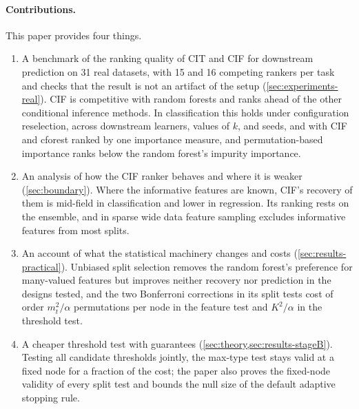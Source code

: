 \paragraph{Contributions.}
This paper provides four things.
\begin{enumerate}[label=(\arabic*),leftmargin=*]
  \item A benchmark of the ranking quality of CIT and CIF for downstream
  prediction on 31 real datasets, with 15 and 16 competing rankers per task and
  checks that the result is not an artifact of the setup
  (\cref{sec:experiments-real}). CIF is competitive with random forests and ranks
  ahead of the other conditional inference methods. In classification this holds under
  configuration reselection, across downstream learners, values of $k$, and
  seeds, and with CIF and cforest ranked by one importance measure, and
  permutation-based importance ranks below the random forest's impurity
  importance.
  \item An analysis of how the CIF ranker behaves and where it is weaker
  (\cref{sec:boundary}). Where the informative features are known, CIF's
  recovery of them is mid-field in classification and lower in regression. Its ranking rests on
  the ensemble, and in sparse wide data feature sampling excludes informative
  features from most splits.
  \item An account of what the statistical machinery changes and costs
  (\cref{sec:results-practical}). Unbiased split selection removes the random
  forest's preference for many-valued features but improves neither recovery
  nor prediction in the designs tested, and the two Bonferroni corrections in its split tests cost of order
  $m_t^2/\alpha$ permutations per node in the feature test and $K^2/\alpha$ in
  the threshold test.
  \item A cheaper threshold test with guarantees
  (\cref{sec:theory,sec:results-stageB}). Testing all candidate thresholds
  jointly, the max-type test stays valid at a fixed node for a fraction of the
  cost; the paper also proves the fixed-node validity of every split test and
  bounds the null size of the default adaptive stopping rule.
\end{enumerate}
